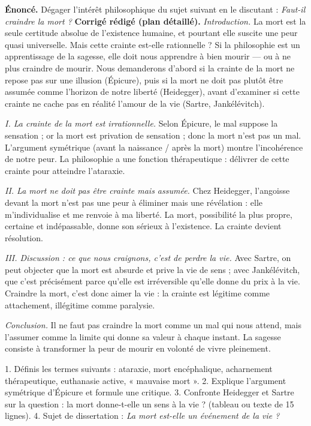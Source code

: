 \documentclass[11pt]{article}
\begin{document}
\begin{exoresolu}
\textbf{Énoncé.} Dégager l'intérêt philosophique du sujet suivant en le discutant : \emph{Faut-il craindre la mort ?}
\tcblower
\textbf{Corrigé rédigé (plan détaillé).}
\emph{Introduction.} La mort est la seule certitude absolue de l'existence humaine, et pourtant elle suscite une peur quasi universelle. Mais cette crainte est-elle rationnelle ? Si la philosophie est un apprentissage de la sagesse, elle doit nous apprendre à bien mourir — ou à ne plus craindre de mourir. Nous demanderons d'abord si la crainte de la mort ne repose pas sur une illusion (Épicure), puis si la mort ne doit pas plutôt être assumée comme l'horizon de notre liberté (Heidegger), avant d'examiner si cette crainte ne cache pas en réalité l'amour de la vie (Sartre, Jankélévitch).

\emph{I. La crainte de la mort est irrationnelle.} Selon Épicure, le mal suppose la sensation ; or la mort est privation de sensation ; donc la mort n'est pas un mal. L'argument symétrique (avant la naissance / après la mort) montre l'incohérence de notre peur. La philosophie a une fonction thérapeutique : délivrer de cette crainte pour atteindre l'ataraxie.

\emph{II. La mort ne doit pas être crainte mais assumée.} Chez Heidegger, l'angoisse devant la mort n'est pas une peur à éliminer mais une révélation : elle m'individualise et me renvoie à ma liberté. La mort, possibilité la plus propre, certaine et indépassable, donne son sérieux à l'existence. La crainte devient résolution.

\emph{III. Discussion : ce que nous craignons, c'est de perdre la vie.} Avec Sartre, on peut objecter que la mort est absurde et prive la vie de sens ; avec Jankélévitch, que c'est précisément parce qu'elle est irréversible qu'elle donne du prix à la vie. Craindre la mort, c'est donc aimer la vie : la crainte est légitime comme attachement, illégitime comme paralysie.

\emph{Conclusion.} Il ne faut pas craindre la mort comme un mal qui nous attend, mais l'assumer comme la limite qui donne sa valeur à chaque instant. La sagesse consiste à transformer la peur de mourir en volonté de vivre pleinement.
\end{exoresolu}

\begin{exercice}
1. Définis les termes suivants : ataraxie, mort encéphalique, acharnement thérapeutique, euthanasie active, « mauvaise mort ».
2. Explique l'argument symétrique d'Épicure et formule une critique.
3. Confronte Heidegger et Sartre sur la question : la mort donne-t-elle un sens à la vie ? (tableau ou texte de 15 lignes).
4. Sujet de dissertation : \emph{La mort est-elle un événement de la vie ?}
\end{exercice}
\end{document}
